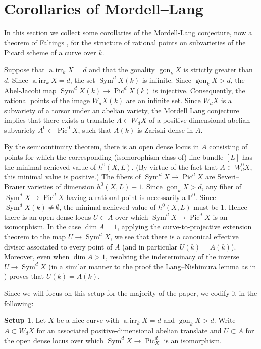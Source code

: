 \documentclass[11pt]{amsart}
\newcommand{\pp}{\mathbb{P}}
\DeclareMathOperator{\Pic}{Pic}
\DeclareMathOperator{\Sym}{Sym}
\newcommand{\airr}{\operatorname{a.\!irr}}
\newcommand{\gon}{\operatorname{gon}}
\theoremstyle{definition}
\newtheorem{setup}[theorem]{Setup}
\theoremstyle{remark}
\begin{document}
\section{Corollaries of Mordell--Lang}\label{sec:Mordell-Lang}

In this section we collect some corollaries of the Mordell-Lang conjecture, now a theorem of Faltings \cite{Faltings1991}, for the structure of rational points on subvarieties of the Picard scheme of a curve over \(k\).

Suppose that $\airr_k X =d$ and that the gonality $\gon_k X$ is strictly greater than $d$. Since $\airr_k X=d$, the set $\Sym^d X (k)$ is infinite. Since $\gon_k X > d$, the Abel-Jacobi map $\Sym^d X (k) \to \Pic^d X(k)$ is injective. Consequently, the rational points of the image $W_dX(k)$ are an infinite set.  Since \(W_dX\) is a subvariety of a torsor under an abelian variety, the Mordell Lang conjecture implies that there exists a translate $A \subset W_d X$ of a positive-dimensional abelian subvariety $A^0 \subset \Pic^0X$, such that $A(k)$ is Zariski dense in $A$.

By the semicontinuity theorem, there is an open dense locus in \(A\) consisting of points for which the corresponding (isomorophism class of) line bundle \([L]\) has the minimal achieved value of \(h^0(X, L)\).  (By virtue of the fact that \(A \subset W^0_dX\), this minimal value is positive.)  The fibers of \(\Sym^dX \to \Pic^dX\) are Severi--Brauer varieties of dimension \(h^0(X, L)-1\).  Since \(\gon_k X > d \), any fiber of \(\Sym^d X \to \Pic^dX\) having a rational point is necessarily a \(\pp^0\).  Since \(\Sym^dX(k) \neq \emptyset\), the minimal achieved value of \(h^0(X, L)\) must be \(1\).  Hence there is an open dense locus \(U \subset A\) over which \(\Sym^d X \to \Pic^dX\) is an isomorphism.
In the case \(\dim A = 1\), applying the curve-to-projective extension theorem to the map \(U \to \Sym^dX\), we see that there is a canonical effective divisor associated to every point of \(A\) (and in particular \(U(k) = A(k)\)).  Moreover, even when \(\dim A > 1\), resolving the indeterminacy of the inverse \(U \to \Sym^dX\) (in a similar manner to the proof the Lang--Nishimura lemma as in \cite[Proposition A.6]{RY00}) proves that \(U(k) = A(k)\).

Since we will focus on this setup for the majority of the paper, we codify it in the following:

\begin{setup}\label{main_setup}
Let \(X\) be a nice curve with \(\airr_k X  = d\) and \(\gon_k X > d\).  Write \(A \subset W_dX\) for an associated positive-dimensional abelian translate and \(U \subset A\) for the open dense locus over which \(\Sym^d X \to \Pic^d_X\) is an isomorphism.
\end{setup}
\end{document}
